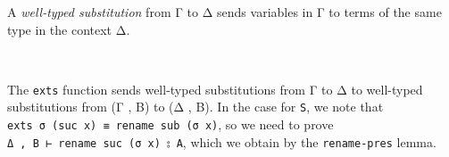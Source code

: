 A \emph{well-typed substitution} from Γ to Δ sends variables in Γ to
terms of the same type in the context Δ.

\begin{fence}
\begin{code}%
\>[0]\AgdaSpace{}%
\AgdaSymbol{:}\AgdaSpace{}%
\AgdaSymbol{(}\AgdaSpace{}%
\AgdaSpace{}%
\AgdaSymbol{)}\AgdaSpace{}%
\AgdaSpace{}%
\AgdaSpace{}%
\AgdaSpace{}%
\AgdaSpace{}%
\AgdaSpace{}%
\<%
\\
\>[0]\AgdaSpace{}%
\AgdaSpace{}%
\AgdaSpace{}%
\AgdaSpace{}%
\AgdaSpace{}%
\AgdaSymbol{=}\AgdaSpace{}%
\AgdaSpace{}%
\AgdaSymbol{\{}\AgdaSpace{}%
\AgdaSymbol{\}}\AgdaSpace{}%
\AgdaSpace{}%
\AgdaSpace{}%
\AgdaSpace{}%
\AgdaSpace{}%
\AgdaSpace{}%
\AgdaSpace{}%
\AgdaSpace{}%
\AgdaSpace{}%
\AgdaSpace{}%
\AgdaSpace{}%
\AgdaSpace{}%
\AgdaSymbol{(}\AgdaSpace{}%
\AgdaSymbol{)}\AgdaSpace{}%
\AgdaSpace{}%
\<%
\end{code}
\end{fence}

The \texttt{exts} function sends well-typed substitutions from Γ to Δ to
well-typed substitutions from (Γ , B) to (Δ , B). In the case for
\texttt{S}, we note that
\texttt{exts\ σ\ (suc\ x)\ ≡\ rename\ sub\ (σ\ x)}, so we need to prove
\texttt{Δ\ ,\ B\ ⊢\ rename\ suc\ (σ\ x)\ ⦂\ A}, which we obtain by the
\texttt{rename-pres} lemma.

